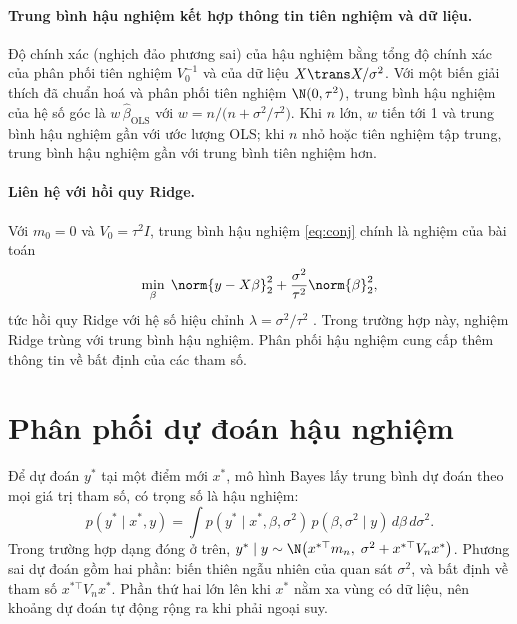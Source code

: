 \documentclass[12pt,a4paper]{report}
\begin{document}
\paragraph{Trung bình hậu nghiệm kết hợp thông tin tiên nghiệm và dữ liệu.} Độ chính
xác (nghịch đảo phương sai) của hậu nghiệm bằng tổng độ chính xác của phân phối tiên nghiệm
$V_0^{-1}$ và của dữ liệu $X\trans X / \sigma^2$. Với một biến giải thích đã
chuẩn hoá và phân phối tiên nghiệm $\N(0, \tau^2)$, trung bình hậu nghiệm của hệ số góc là
$w\, \hat\beta_{\text{OLS}}$ với
$w = n / \bigl(n + \sigma^2/\tau^2\bigr)$. Khi $n$ lớn, $w$ tiến tới 1 và trung bình hậu
nghiệm gần với ước lượng OLS; khi $n$ nhỏ hoặc tiên nghiệm tập trung, trung bình hậu nghiệm gần với trung bình tiên nghiệm hơn.

\paragraph{Liên hệ với hồi quy Ridge.} Với $m_0 = 0$ và $V_0 = \tau^2 I$, trung
bình hậu nghiệm \eqref{eq:conj} chính là nghiệm của bài toán
%
\begin{equation}
  \label{eq:ridge}
  \min_{\beta} \; \norm{y - X\beta}_2^2 + \frac{\sigma^2}{\tau^2} \norm{\beta}_2^2 ,
\end{equation}
%
tức hồi quy Ridge với hệ số hiệu chỉnh $\lambda = \sigma^2 / \tau^2$
\cite{murphy2012ml}. Trong trường hợp này, nghiệm Ridge trùng với trung bình hậu nghiệm.
Phân phối hậu nghiệm cung cấp thêm thông tin về bất định của các tham số.

\section{Phân phối dự đoán hậu nghiệm}

Để dự đoán $y^\ast$ tại một điểm mới $x^\ast$, mô hình Bayes lấy trung bình dự
đoán theo mọi giá trị tham số, có trọng số là hậu nghiệm:
%
\begin{equation}
  \label{eq:predictive}
  p(y^\ast \mid x^\ast, y) = \int p(y^\ast \mid x^\ast, \beta, \sigma^2)\,
  p(\beta, \sigma^2 \mid y)\, d\beta\, d\sigma^2 .
\end{equation}
%
Trong trường hợp dạng đóng ở trên, $y^\ast \mid y \sim
\N\bigl(x^{\ast\top} m_n,\; \sigma^2 + x^{\ast\top} V_n x^\ast\bigr)$. Phương sai
dự đoán gồm hai phần: biến thiên ngẫu nhiên của quan sát $\sigma^2$, và bất định về tham số
$x^{\ast\top} V_n x^\ast$. Phần thứ hai lớn lên khi $x^\ast$ nằm xa vùng có dữ
liệu, nên khoảng dự đoán tự động rộng ra khi phải ngoại suy.
\end{document}

